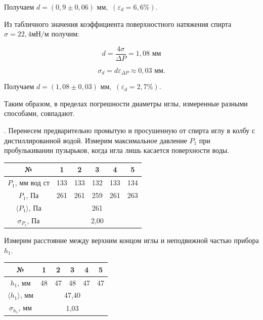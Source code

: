 \documentclass[a4paper,12pt]{article} %
\begin{document}
{\medskip

\noindent Получаем { $d = (0,9 \pm 0,06) \text{ мм},$} $(\varepsilon_d = 6,6 \%) $.

\medskip

\noindent Из табличного значения коэффициента поверхностного натяжения спирта $\sigma = 22,4 \text{мН/м}$ получим:

\medskip

\begin{equation}
d = \frac{4\sigma}{\Delta P} = 1,08\text{ мм}
\end{equation}

\medskip

\begin{equation}
\sigma_d=d \varepsilon_{\Delta P} \approx 0,03 \text{ мм}.
\end{equation}

\medskip

\noindent Получаем { $d = (1,08 \pm 0,03) \text{ мм},$} $(\varepsilon_d = 2,7 \%) $.

\medskip

\noindent Таким образом, в пределах погрешности диаметры иглы, измеренные разными способами, совпадают.

\medskip


. Перенесем предварительно промытую и просушенную от спирта иглу в колбу с дистиллированной водой. Измерим максимальное давление $P_{1}$ при пробулькивании пузырьков, когда игла лишь касается поверхности воды.

\medskip

\begin{tabular}{|c|c|c|c|c|c|}
\hline 
№ & 1 & 2 & 3 & 4 & 5 \\ 
\hline 
$P_{1}$, мм вод ст & 133 & 133 & 132 & 133 & 134 \\ 
\hline 
$P_{1}$, Па & 261 & 261 & 259 & 261 & 263 \\ 
\hline 
$\langle P_{1} \rangle$, Па & \multicolumn{5}{c|}{261} \\ 
\hline 
$\sigma_{P_{1}} $, Па  & \multicolumn{5}{c|}{2,00} \\ 
\hline 
\end{tabular} 

\medskip

\noindent Измерим расстояние между верхним концом иглы и неподвижной частью прибора $h_{1}$.

\medskip

\begin{tabular}{|c|c|c|c|c|c|}
\hline 
№ & 1 & 2 & 3 & 4 & 5 \\ 
\hline 
$h_{1}$, мм & 48 & 47 & 48 & 47 & 47 \\ 
\hline 
$\langle h_{1} \rangle$, мм & \multicolumn{5}{c|}{47,40} \\ 
\hline 
$\sigma_{h_{1}}$, мм & \multicolumn{5}{c|}{1,03} \\ 
\hline 
\end{tabular} 

}
\end{document}
